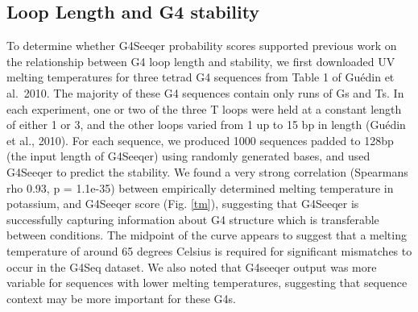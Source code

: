\documentclass[12pt,a4paper,]{report}
\begin{document}
\newpage

\hypertarget{loop-length-and-g4-stability}{%
\subsection{Loop Length and G4
stability}\label{loop-length-and-g4-stability}}

To determine whether G4Seeqer probability scores supported previous work
on the relationship between G4 loop length and stability, we first
downloaded UV melting temperatures for three tetrad G4 sequences from
Table 1 of Guédin et al.~2010. The majority of these G4 sequences
contain only runs of Gs and Ts. In each experiment, one or two of the
three T loops were held at a constant length of either 1 or 3, and the
other loops varied from 1 up to 15 bp in length (Guédin et al., 2010).
For each sequence, we produced 1000 sequences padded to 128bp (the input
length of G4Seeqer) using randomly generated bases, and used G4Seeqer to
predict the stability. We found a very strong correlation (Spearmans rho
0.93, p = 1.1e-35) between empirically determined melting temperature in
potassium, and G4Seeqer score (Fig. \ref{tm}), suggesting that G4Seeqer
is successfully capturing information about G4 structure which is
transferable between conditions. The midpoint of the curve appears to
suggest that a melting temperature of around 65 degrees Celsius is
required for significant mismatches to occur in the G4Seq dataset. We
also noted that G4seeqer output was more variable for sequences with
lower melting temperatures, suggesting that sequence context may be more
important for these G4s.

\newpage
\end{document}
